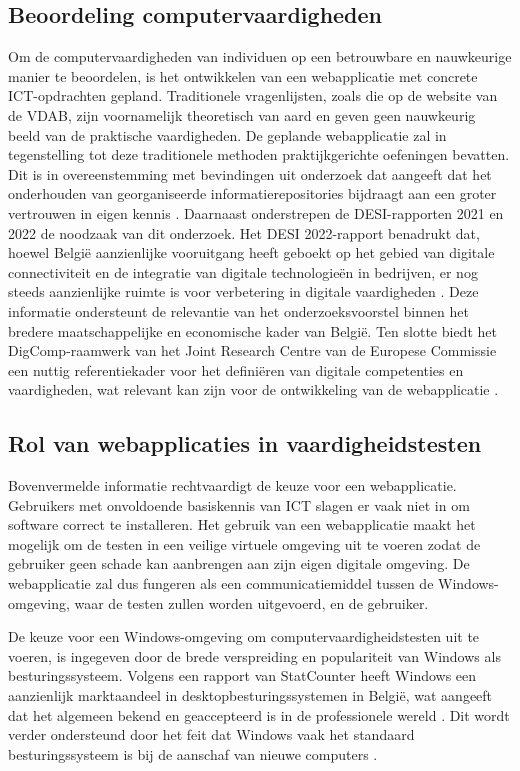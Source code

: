 \subsection{Beoordeling computervaardigheden}
Om de computervaardigheden van individuen op een betrouwbare en nauwkeurige manier te beoordelen, is het ontwikkelen van een webapplicatie met concrete ICT-opdrachten gepland. Traditionele vragenlijsten, zoals die op de website van de VDAB, zijn voornamelijk theoretisch van aard en geven geen nauwkeurig beeld van de praktische vaardigheden.
De geplande webapplicatie zal in tegenstelling tot deze traditionele methoden praktijkgerichte oefeningen bevatten. Dit is in overeenstemming met bevindingen uit onderzoek dat aangeeft dat het onderhouden van georganiseerde informatierepositories bijdraagt aan een groter vertrouwen in eigen kennis \autocite{JudgingKnowledge}.
Daarnaast onderstrepen de DESI-rapporten 2021 en 2022 de noodzaak van dit onderzoek. Het DESI 2022-rapport benadrukt dat, hoewel België aanzienlijke vooruitgang heeft geboekt op het gebied van digitale connectiviteit en de integratie van digitale technologieën in bedrijven, er nog steeds aanzienlijke ruimte is voor verbetering in digitale vaardigheden \autocite{DESIRaport}. Deze  informatie ondersteunt de relevantie van het onderzoeksvoorstel binnen het bredere maatschappelijke en economische kader van België.
Ten slotte biedt het DigComp-raamwerk van het Joint Research Centre van de Europese Commissie een nuttig referentiekader voor het definiëren van digitale competenties en vaardigheden, wat relevant kan zijn voor de ontwikkeling van de webapplicatie \autocite{DigCompFramework}.

\subsection{Rol van webapplicaties in vaardigheidstesten}
Bovenvermelde informatie rechtvaardigt de k\-euze voor een webapplicatie. Gebruikers met onvoldoende basiskennis van ICT slagen er vaak niet in om software correct te installeren. Het gebruik van een webapplicatie maakt het mogelijk om de testen in een veilige virtuele omgeving uit te voeren zodat de gebruiker geen schade kan aanbrengen aan zijn eigen digitale omgeving. De webapplicatie zal dus fungeren als een communicatiemiddel tussen de Windows-omgeving, waar de testen zullen worden uitgevoerd, en de gebruiker.

De keuze voor een Windows-omgeving om computervaardigheidstesten uit te voeren, is ingegeven door de brede verspreiding en populariteit van Windows als besturingssysteem. Volgens een rapport van StatCounter heeft Windows een aanzienlijk marktaandeel in desktopbesturingssystemen in België, wat aangeeft dat het algemeen bekend en geaccepteerd is in de professionele wereld \autocite{StatCounterOSMarketShare}. Dit wordt verder ondersteund door het feit dat Windows vaak het standaard besturingssysteem is bij de aanschaf van nieuwe computers \autocite{ProfolusWindowsPopularity}.

